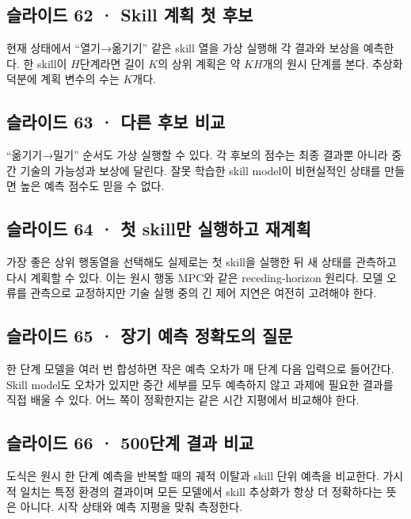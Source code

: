 \documentclass[11pt,a4paper]{article}
\begin{document}
\subsection{슬라이드 62 · Skill 계획 첫 후보}

현재 상태에서 “열기→옮기기” 같은 skill 열을 가상 실행해 각 결과와 보상을 예측한다. 한 skill이 $H$단계라면 길이 $K$의 상위 계획은 약 $KH$개의 원시 단계를 본다. 추상화 덕분에 계획 변수의 수는 $K$개다.\par

\subsection{슬라이드 63 · 다른 후보 비교}

“옮기기→밀기” 순서도 가상 실행할 수 있다. 각 후보의 점수는 최종 결과뿐 아니라 중간 기술의 가능성과 보상에 달린다. 잘못 학습한 skill model이 비현실적인 상태를 만들면 높은 예측 점수도 믿을 수 없다.\par

\subsection{슬라이드 64 · 첫 skill만 실행하고 재계획}

가장 좋은 상위 행동열을 선택해도 실제로는 첫 skill을 실행한 뒤 새 상태를 관측하고 다시 계획할 수 있다. 이는 원시 행동 MPC와 같은 receding-horizon 원리다. 모델 오류를 관측으로 교정하지만 기술 실행 중의 긴 제어 지연은 여전히 고려해야 한다.\par

\subsection{슬라이드 65 · 장기 예측 정확도의 질문}

한 단계 모델을 여러 번 합성하면 작은 예측 오차가 매 단계 다음 입력으로 들어간다. Skill model도 오차가 있지만 중간 세부를 모두 예측하지 않고 과제에 필요한 결과를 직접 배울 수 있다. 어느 쪽이 정확한지는 같은 시간 지평에서 비교해야 한다.\par

\subsection{슬라이드 66 · 500단계 결과 비교}

도식은 원시 한 단계 예측을 반복할 때의 궤적 이탈과 skill 단위 예측을 비교한다. 가시적 일치는 특정 환경의 결과이며 모든 모델에서 skill 추상화가 항상 더 정확하다는 뜻은 아니다. 시작 상태와 예측 지평을 맞춰 측정한다.\par
\end{document}
